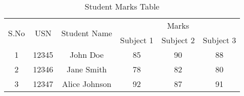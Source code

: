 \documentclass{article}
\begin{document}
\begin{table}[h!]
\centering
\begin{tabular}{|c|c|c|c|c|c|}
\hline
\multirow{2}{}{S.No} & \multirow{2}{}{USN} & \multirow{2}{*}{Student Name} & \multicolumn{3}{c|}{Marks} \\ \cline{4-6} 
                      &                      &                               & Subject 1 & Subject 2 & Subject 3 \\ \hline
1                     & 12345                & John Doe                      & 85        & 90        & 88        \\ \hline
2                     & 12346                & Jane Smith                    & 78        & 82        & 80        \\ \hline
3                     & 12347                & Alice Johnson                 & 92        & 87        & 91        \\ \hline
\end{tabular}
\caption{Student Marks Table}
\label{tab:student_marks}
\end{table}
\end{document}
